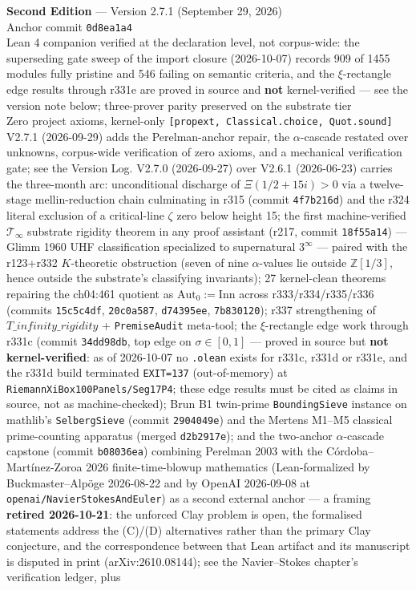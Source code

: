 \begin{titlepage}
{\normalsize \textbf{Second Edition} --- Version 2.7.1 (September 29, 2026)\\[2pt]
\normalsize Anchor commit \texttt{0d8ea1a4}\\[2pt]
\normalsize Lean 4 companion verified at the declaration level, not corpus-wide: the superseding gate sweep of the import closure (2026-10-07) records 909 of 1455 modules fully pristine and 546 failing on semantic criteria, and the $\xi$-rectangle edge results through r331e are proved in source and \textbf{not} kernel-verified --- see the version note below; three-prover parity preserved on the substrate tier\\[2pt]
\normalsize Zero project axioms, kernel-only \texttt{[propext, Classical.choice, Quot.sound]}\\[2pt]
\normalsize V2.7.1 (2026-09-29) adds the Perelman-anchor repair, the $\alpha$-cascade restated over unknowns, corpus-wide verification of zero axioms, and a mechanical verification gate; see the Version Log. V2.7.0 (2026-09-27) over V2.6.1 (2026-06-23) carries the three-month arc: unconditional discharge of $\Xi(1/2 + 15i) > 0$ via a twelve-stage mellin-reduction chain culminating in r315 (commit \texttt{4f7b216d}) and the r324 literal exclusion of a critical-line $\zeta$ zero below height 15; the first machine-verified $\mathcal{T}_\infty$ substrate rigidity theorem in any proof assistant (r217, commit \texttt{18f55a14}) --- Glimm 1960 UHF classification specialized to supernatural $3^\infty$ --- paired with the r123+r332 $K$-theoretic obstruction (seven of nine $\alpha$-values lie outside $\mathbb{Z}[1/3]$, hence outside the substrate's classifying invariants); 27 kernel-clean theorems repairing the ch04:461 quotient as $\text{Aut}_0 := \text{Inn}$ across r333/r334/r335/r336 (commits \texttt{15c5c4df}, \texttt{20c0a587}, \texttt{d74395ee}, \texttt{7b830120}); r337 strengthening of $T\_infinity\_rigidity$ + \texttt{PremiseAudit} meta-tool; the $\xi$-rectangle edge work through r331c (commit \texttt{34dd98db}, top edge on $\sigma \in [0,1]$ --- proved in source but \textbf{not kernel-verified}: as of 2026-10-07 no \texttt{.olean} exists for r331c, r331d or r331e, and the r331d build terminated \texttt{EXIT=137} (out-of-memory) at \texttt{RiemannXiBox100Panels/Seg17P4}; these edge results must be cited as claims in source, not as machine-checked); Brun B1 twin-prime \texttt{BoundingSieve} instance on mathlib's \texttt{SelbergSieve} (commit \texttt{2904049e}) and the Mertens M1--M5 classical prime-counting apparatus (merged \texttt{d2b2917e}); and the two-anchor $\alpha$-cascade capstone (commit \texttt{b08036ea}) combining Perelman 2003 with the C\'ordoba--Mart\'inez-Zoroa 2026 finite-time-blowup mathematics (Lean-formalized by Buckmaster--Alp\"oge 2026-08-22 and by OpenAI 2026-09-08 at \texttt{openai/NavierStokesAndEuler}) as a second external anchor --- a framing \textbf{retired 2026-10-21}: the unforced Clay problem is open, the formalised statements address the (C)/(D) alternatives rather than the primary Clay conjecture, and the correspondence between that Lean artifact and its manuscript is disputed in print (arXiv:2610.08144); see the Navier--Stokes chapter's verification ledger, plus }
\end{titlepage}
